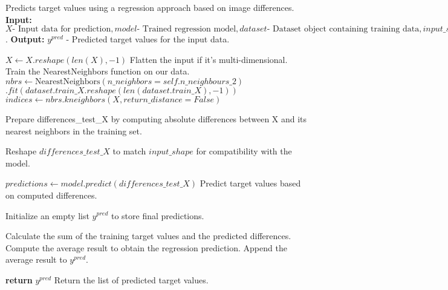 \documentclass[a4paper, 12pt]{report}
\begin{document}
\begin{algorithm}
    \caption{Prediction with LingerImageRegressor}
    \label{alg:prediction_with_lingerImageRegressor}
    \begin{algorithmic}[1]
        \State Predicts target values using a regression approach based on image differences.
        \State \textbf{Input:} $X \text{- Input data for prediction}, model \text{- Trained regression model}, dataset \text{- Dataset object containing training data}, input\_shape \text{- Shape of input data expected by the model}$.
        \State \textbf{Output:} $y^{pred}$ - Predicted target values for the input data.
        
            \State $X \gets X.reshape(len(X), -1)$
            \State Flatten the input if it's multi-dimensional.
        \EndIf
        \State Train the NearestNeighbors function on our data.
        \State $nbrs \gets \text{NearestNeighbors}(n\_neighbors=self.n\_neighbours\_2)$
        \State \hspace{\algorithmicindent} $.fit(dataset.train\_X.reshape(len(dataset.train\_X), -1))$
        \State $indices \gets nbrs.kneighbors(X, return\_distance=False)$
        
        \State Prepare differences\_test\_X by computing absolute differences between X 
        \State \hspace{\algorithmicindent} and its nearest neighbors in the training set.
        
        \State Reshape $differences\_test\_X$ to match $input\_shape$ for compatibility with the model.
        
        \State $predictions \gets model.predict(differences\_test\_X)$
        \State Predict target values based on computed differences.
        
        \State Initialize an empty list $y^{pred}$ to store final predictions.
        
            \State Calculate the sum of the training target values and the predicted differences.
            \State Compute the average result to obtain the regression prediction.
            \State Append the average result to $y^{pred}$.
        \EndFor
        
        \State \textbf{return} $y^{pred}$
        \State Return the list of predicted target values.
    \EndProcedure
    \end{algorithmic}
\end{algorithm}
\end{document}
